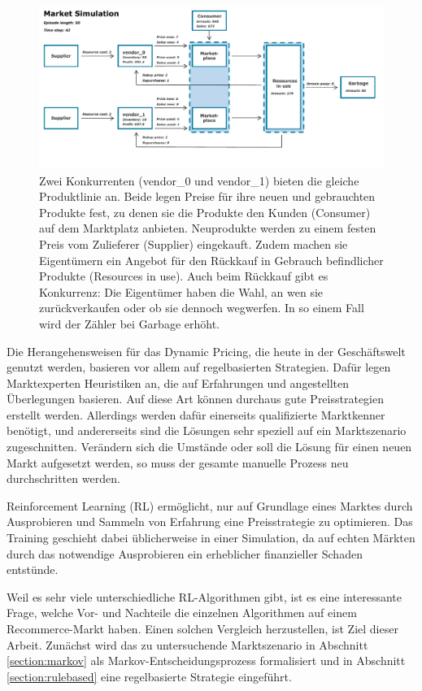 \begin{figure}[htb]
	\centering
	\includegraphics[width=\textwidth]{introduction/MarketOverview_042.pdf}
	\caption{
		Zwei Konkurrenten (vendor\_0 und vendor\_1) bieten die gleiche Produktlinie an.
		Beide legen Preise für ihre neuen und gebrauchten Produkte fest,
        zu denen sie die Produkte den Kunden (Consumer) auf dem Marktplatz anbieten.
        Neuprodukte werden zu einem festen Preis vom Zulieferer (Supplier) eingekauft.
		Zudem machen sie Eigentümern ein Angebot für den Rückkauf in Gebrauch befindlicher Produkte (Resources in use).
		Auch beim Rückkauf gibt es Konkurrenz: Die Eigentümer haben die Wahl, an wen sie zurückverkaufen oder ob sie dennoch wegwerfen.
        In so einem Fall wird der Zähler bei Garbage erhöht.
	}
	\label{graphic:MarketOverview}
\end{figure}

Die Herangehensweisen für das Dynamic Pricing, die heute in der Geschäftswelt genutzt werden, basieren vor allem auf regelbasierten Strategien.
Dafür legen Marktexperten Heuristiken an, die auf Erfahrungen und angestellten Überlegungen basieren.
Auf diese Art können durchaus gute Preisstrategien erstellt werden.
Allerdings werden dafür einerseits qualifizierte Marktkenner benötigt, und andererseits sind die Lösungen sehr speziell auf ein Marktszenario zugeschnitten.
Verändern sich die Umstände oder soll die Lösung für einen neuen Markt aufgesetzt werden, so muss der gesamte manuelle Prozess neu durchschritten werden.

Reinforcement Learning (RL) ermöglicht, nur auf Grundlage eines Marktes durch Ausprobieren und Sammeln von Erfahrung eine Preisstrategie zu optimieren.
Das Training geschieht dabei üblicherweise in einer Simulation, da auf echten Märkten durch das notwendige Ausprobieren ein erheblicher finanzieller Schaden entstünde.

Weil es sehr viele unterschiedliche RL-Algorithmen gibt, ist es eine interessante Frage, welche Vor- und Nachteile die einzelnen Algorithmen auf einem Recommerce-Markt haben.
Einen solchen Vergleich herzustellen, ist Ziel dieser Arbeit.
Zunächst wird das zu untersuchende Marktszenario in Abschnitt \ref{section:markov} als Markov-Entscheidungsprozess formalisiert und in Abschnitt \ref{section:rulebased} eine regelbasierte Strategie eingeführt.

